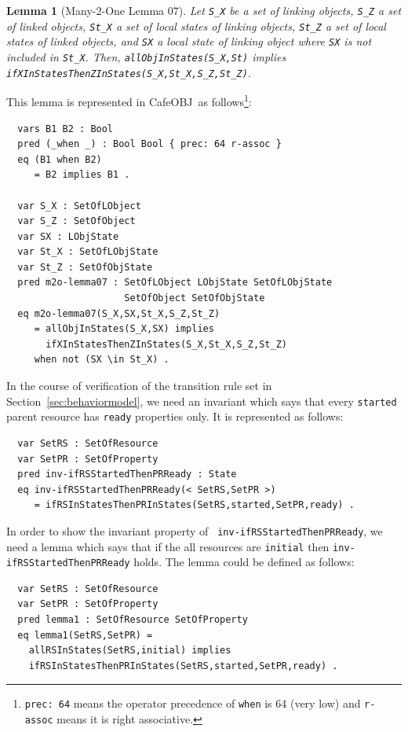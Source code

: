 \documentclass[12pt]{report}
\newtheorem{lemma}{Lemma}
\newcommand{\stt}[1]{{\small{\tt {#1}}}}
\newcommand{\cafeobj}{{\sf CafeOBJ}~}
\begin{document}
\begin{lemma}[Many-2-One Lemma 07]
  Let {\tt S\_X} be a set of linking objects, {\tt S\_Z} a set of
  linked objects, {\tt St\_X} a set of local states of linking
  objects, {\tt St\_Z} a set of local states of linked objects, and
  {\tt SX} a local state of linking object where {\tt SX} is not
  included in {\tt St\_X}. Then, \stt{allObjInStates(S\_X,St)} implies
  \stt{ifXInStatesThenZInStates(S\_X,St\_X,S\_Z,St\_Z)}.
\end{lemma}
This lemma is represented in \cafeobj as follows\footnote{\stt{prec:~64} 
means the operator precedence of {\tt when} is 64 (very low) and 
{\tt r-assoc} means it is right associative.}:
\small
\begin{verbatim}
  vars B1 B2 : Bool
  pred (_when _) : Bool Bool { prec: 64 r-assoc }
  eq (B1 when B2)
     = B2 implies B1 .

  var S_X : SetOfLObject
  var S_Z : SetOfObject
  var SX : LObjState
  var St_X : SetOfLObjState
  var St_Z : SetOfObjState
  pred m2o-lemma07 : SetOfLObject LObjState SetOfLObjState 
                     SetOfObject SetOfObjState
  eq m2o-lemma07(S_X,SX,St_X,S_Z,St_Z)
     = allObjInStates(S_X,SX) implies 
       ifXInStatesThenZInStates(S_X,St_X,S_Z,St_Z)
     when not (SX \in St_X) .
\end{verbatim}
\normalsize
In the course of verification of the transition rule set in
Section~\ref{sec:behaviormodel}, we need an invariant which says that
every {\tt started} parent resource has {\tt ready} properties
only. It is represented as follows:
\small
\begin{verbatim}
  var SetRS : SetOfResource
  var SetPR : SetOfProperty
  pred inv-ifRSStartedThenPRReady : State
  eq inv-ifRSStartedThenPRReady(< SetRS,SetPR >)
     = ifRSInStatesThenPRInStates(SetRS,started,SetPR,ready) .
\end{verbatim}
\normalsize
In order to show the invariant property of {\tt
  inv-ifRSStartedThenPRReady}, we need a lemma which says that if the all
resources are {\tt initial} then {\tt inv-ifRSStartedThenPRReady}
holds.  The lemma could be defined as follows:
\small
\begin{verbatim}
  var SetRS : SetOfResource
  var SetPR : SetOfProperty
  pred lemma1 : SetOfResource SetOfProperty
  eq lemma1(SetRS,SetPR) =
    allRSInStates(SetRS,initial) implies
    ifRSInStatesThenPRInStates(SetRS,started,SetPR,ready) .
\end{verbatim}
\end{document}
